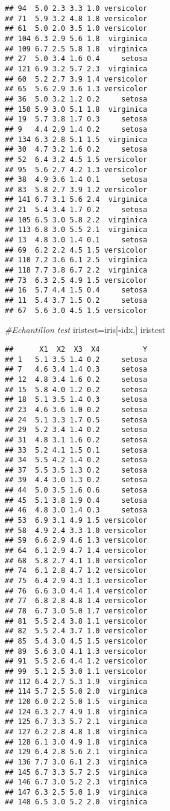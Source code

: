 \documentclass[
]{article}
\newenvironment{Shaded}{\begin{snugshade}}{\end{snugshade}}
\newcommand{\CommentTok}[1]{\textcolor[rgb]{0.56,0.35,0.01}{\textit{#1}}}
\newcommand{\NormalTok}[1]{#1}
\newcommand{\OperatorTok}[1]{\textcolor[rgb]{0.81,0.36,0.00}{\textbf{#1}}}
\begin{document}
\begin{verbatim}
## 94  5.0 2.3 3.3 1.0 versicolor
## 71  5.9 3.2 4.8 1.8 versicolor
## 61  5.0 2.0 3.5 1.0 versicolor
## 104 6.3 2.9 5.6 1.8  virginica
## 109 6.7 2.5 5.8 1.8  virginica
## 27  5.0 3.4 1.6 0.4     setosa
## 121 6.9 3.2 5.7 2.3  virginica
## 60  5.2 2.7 3.9 1.4 versicolor
## 65  5.6 2.9 3.6 1.3 versicolor
## 36  5.0 3.2 1.2 0.2     setosa
## 150 5.9 3.0 5.1 1.8  virginica
## 19  5.7 3.8 1.7 0.3     setosa
## 9   4.4 2.9 1.4 0.2     setosa
## 134 6.3 2.8 5.1 1.5  virginica
## 30  4.7 3.2 1.6 0.2     setosa
## 52  6.4 3.2 4.5 1.5 versicolor
## 95  5.6 2.7 4.2 1.3 versicolor
## 38  4.9 3.6 1.4 0.1     setosa
## 83  5.8 2.7 3.9 1.2 versicolor
## 141 6.7 3.1 5.6 2.4  virginica
## 21  5.4 3.4 1.7 0.2     setosa
## 105 6.5 3.0 5.8 2.2  virginica
## 113 6.8 3.0 5.5 2.1  virginica
## 13  4.8 3.0 1.4 0.1     setosa
## 69  6.2 2.2 4.5 1.5 versicolor
## 110 7.2 3.6 6.1 2.5  virginica
## 118 7.7 3.8 6.7 2.2  virginica
## 73  6.3 2.5 4.9 1.5 versicolor
## 16  5.7 4.4 1.5 0.4     setosa
## 11  5.4 3.7 1.5 0.2     setosa
## 67  5.6 3.0 4.5 1.5 versicolor
\end{verbatim}

\begin{Shaded}
\begin{Highlighting}[]
\CommentTok{#Echantillon test}
\NormalTok{iristest=iris[}\OperatorTok{-}\NormalTok{idx,]}
\NormalTok{iristest}
\end{Highlighting}
\end{Shaded}

\begin{verbatim}
##      X1  X2  X3  X4          Y
## 1   5.1 3.5 1.4 0.2     setosa
## 7   4.6 3.4 1.4 0.3     setosa
## 12  4.8 3.4 1.6 0.2     setosa
## 15  5.8 4.0 1.2 0.2     setosa
## 18  5.1 3.5 1.4 0.3     setosa
## 23  4.6 3.6 1.0 0.2     setosa
## 24  5.1 3.3 1.7 0.5     setosa
## 29  5.2 3.4 1.4 0.2     setosa
## 31  4.8 3.1 1.6 0.2     setosa
## 33  5.2 4.1 1.5 0.1     setosa
## 34  5.5 4.2 1.4 0.2     setosa
## 37  5.5 3.5 1.3 0.2     setosa
## 39  4.4 3.0 1.3 0.2     setosa
## 44  5.0 3.5 1.6 0.6     setosa
## 45  5.1 3.8 1.9 0.4     setosa
## 46  4.8 3.0 1.4 0.3     setosa
## 53  6.9 3.1 4.9 1.5 versicolor
## 58  4.9 2.4 3.3 1.0 versicolor
## 59  6.6 2.9 4.6 1.3 versicolor
## 64  6.1 2.9 4.7 1.4 versicolor
## 68  5.8 2.7 4.1 1.0 versicolor
## 74  6.1 2.8 4.7 1.2 versicolor
## 75  6.4 2.9 4.3 1.3 versicolor
## 76  6.6 3.0 4.4 1.4 versicolor
## 77  6.8 2.8 4.8 1.4 versicolor
## 78  6.7 3.0 5.0 1.7 versicolor
## 81  5.5 2.4 3.8 1.1 versicolor
## 82  5.5 2.4 3.7 1.0 versicolor
## 85  5.4 3.0 4.5 1.5 versicolor
## 89  5.6 3.0 4.1 1.3 versicolor
## 91  5.5 2.6 4.4 1.2 versicolor
## 99  5.1 2.5 3.0 1.1 versicolor
## 112 6.4 2.7 5.3 1.9  virginica
## 114 5.7 2.5 5.0 2.0  virginica
## 120 6.0 2.2 5.0 1.5  virginica
## 124 6.3 2.7 4.9 1.8  virginica
## 125 6.7 3.3 5.7 2.1  virginica
## 127 6.2 2.8 4.8 1.8  virginica
## 128 6.1 3.0 4.9 1.8  virginica
## 129 6.4 2.8 5.6 2.1  virginica
## 136 7.7 3.0 6.1 2.3  virginica
## 145 6.7 3.3 5.7 2.5  virginica
## 146 6.7 3.0 5.2 2.3  virginica
## 147 6.3 2.5 5.0 1.9  virginica
## 148 6.5 3.0 5.2 2.0  virginica
\end{verbatim}
\end{document}
